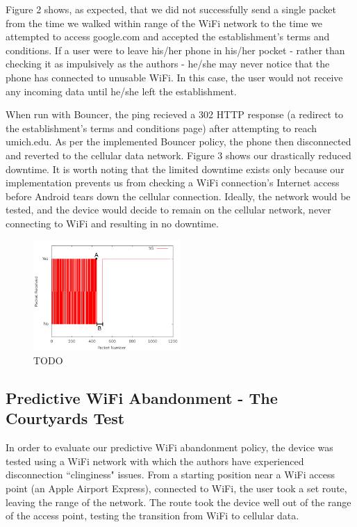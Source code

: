 Figure 2 shows, as expected, that we did not successfully send a single packet from the time we walked within range of the WiFi network to the time we attempted to access google.com and accepted the establishment's terms and conditions. If a user were to leave his/her phone in his/her pocket - rather than checking it as impulsively as the authors - he/she may never notice that the phone has connected to unusable WiFi. In this case, the user would not receive any incoming data until he/she left the establishment.

When run with Bouncer, the ping recieved a 302 HTTP response (a redirect to the establishment's terms and conditions page) after attempting to reach umich.edu. As per the implemented Bouncer policy, the phone then disconnected and reverted to the cellular data network. Figure 3 shows our drastically reduced downtime. It is worth noting that the limited downtime exists only because our implementation prevents us from checking a WiFi connection's Internet access before Android tears down the cellular connection. Ideally, the network would be tested, and the device would decide to remain on the cellular network, never connecting to WiFi and resulting in no downtime.

\begin{figure}
	\includegraphics[width=0.5\textwidth]{paneraWithPolicy}
	\caption{TODO}
\end{figure}

\subsection{Predictive WiFi Abandonment - The Courtyards Test}
In order to evaluate our predictive WiFi abandonment policy, the device was tested using a WiFi network with which the authors have experienced disconnection ``clinginess" issues. From a starting position near a WiFi access point (an Apple Airport Express), connected to WiFi, the user took a set route, leaving the range of the network. The route took the device well out of the range of the access point, testing the transition from WiFi to cellular data.

